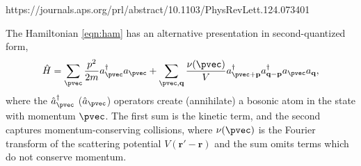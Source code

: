 {{{{{{    https://journals.aps.org/prl/abstract/10.1103/PhysRevLett.124.073401 




The Hamiltonian \ref{eqn:ham} has an alternative presentation in second-quantized form,
	\begin{equation}
		\hat{H} = \sum_\pvec \frac{p^2}{2m} a^\dagger_\pvec a_\pvec +\sum_{\pvec,\textbf{q}} \frac{\nu(\pvec)}{V}a^\dagger_{\pvec+\textbf{p}} a^\dagger_{\textbf{q}-\textbf{p}} a_\pvec a_\textbf{q}, 
	\end{equation}
	where the $\hat{a}^\dagger_\pvec$  ($\hat{a}_\pvec$) operators create (annihilate) a bosonic atom in the state with momentum $\pvec$.
	The first sum is the kinetic term, and the second captures momentum-conserving collisions, where $\nu(\pvec)$ is the Fourier transform of the scattering potential $V(\textbf{r}'-\textbf{r})$ and the sum omits terms which do not conserve momentum.
	

}}}}}}
